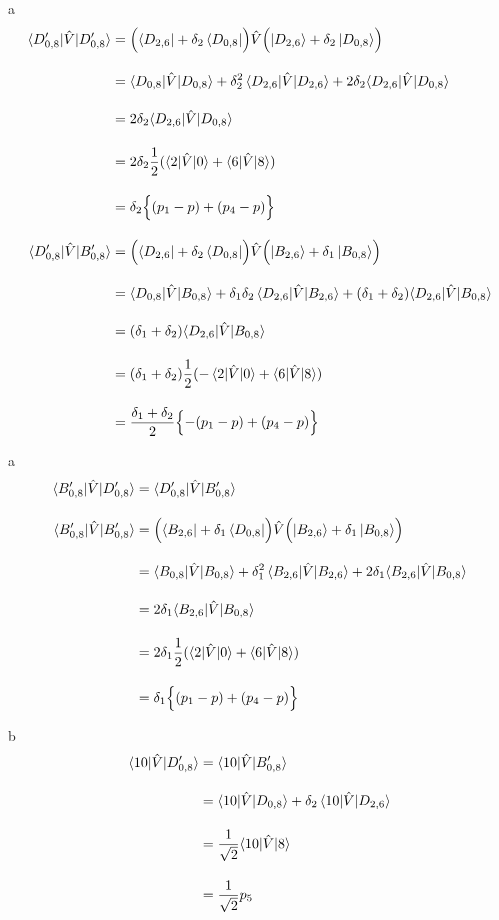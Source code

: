 a
\begin{align}
    \langle{D^\prime_{0,8}|\hat{V}|D^\prime_{0,8}}\rangle
    &=\Bigl(\bra{D_{2,6}} + \delta_2\bra{D_{0,8}}
    \Bigr)
    \hat{V}
    \Bigl(\ket{D_{2,6}} + \delta_2\ket{D_{0,8}}
    \Bigr)\nn[10pt]
    &=\langle{D_{0,8}|\hat{V}|D_{0,8}}\rangle
    +\delta_2^2\braket{D_{2,6}|\hat{V}|D_{2,6}} 
    +2\delta_2\langle{D_{2,6}|\hat{V}|D_{0,8}}\rangle\nn[10pt]
     &=2\delta_2\langle{D_{2,6}|\hat{V}|D_{0,8}}\rangle\nn[10pt]
    &=2\delta_2\frac{1}{2}(\braket{2|\hat{V}|0}+\braket{6|\hat{V}|8})
    \nn[10pt]
    &=\delta_2\Bigl\{
    (p_1-p) + (p_4-p)
    \Bigr\}\\[10pt]
   \langle{D^\prime_{0,8}|\hat{V}|B^\prime_{0,8}}\rangle
   &=\Bigl(\bra{D_{2,6}} + \delta_2\bra{D_{0,8}}
    \Bigr)
    \hat{V}
    \Bigl(\ket{B_{2,6}} + \delta_1\ket{B_{0,8}}
    \Bigr)\nn[10pt]
    &=\langle{D_{0,8}|\hat{V}|B_{0,8}}\rangle
    +\delta_1\delta_2\braket{D_{2,6}|\hat{V}|B_{2,6}} 
    +(\delta_1+\delta_2)\langle{D_{2,6}|\hat{V}|B_{0,8}}\rangle\nn[10pt]
     &=(\delta_1+\delta_2)\langle{D_{2,6}|\hat{V}|B_{0,8}}\rangle\nn[10pt]
    &=(\delta_1+\delta_2)\frac{1}{2}(-\braket{2|\hat{V}|0}+\braket{6|\hat{V}|8})
    \nn[10pt]
    &=\frac{\delta_1+\delta_2}{2}\Bigl\{
    -(p_1-p) + (p_4-p)
    \Bigr\}
\end{align}



a
\begin{align}
    \langle{B^\prime_{0,8}|\hat{V}|D^\prime_{0,8}}\rangle
    &=\langle{D^\prime_{0,8}|\hat{V}|B^\prime_{0,8}}\rangle\nn[10pt]
   \langle{B^\prime_{0,8}|\hat{V}|B^\prime_{0,8}}\rangle
   &=\Bigl(\bra{B_{2,6}} + \delta_1\bra{D_{0,8}}
    \Bigr)
    \hat{V}
    \Bigl(\ket{B_{2,6}} + \delta_1\ket{B_{0,8}}
    \Bigr)\nn[10pt]
    &=\langle{B_{0,8}|\hat{V}|B_{0,8}}\rangle
    +\delta_1^2\braket{B_{2,6}|\hat{V}|B_{2,6}} 
    +2\delta_1\langle{B_{2,6}|\hat{V}|B_{0,8}}\rangle\nn[10pt]
     &=2\delta_1\langle{B_{2,6}|\hat{V}|B_{0,8}}\rangle\nn[10pt]
    &=2\delta_1\frac{1}{2}(\braket{2|\hat{V}|0}+\braket{6|\hat{V}|8})
    \nn[10pt]
    &=\delta_1\Bigl\{
    (p_1-p) + (p_4-p)
    \Bigr\}
\end{align}




b
\begin{align}
    \langle{10|\hat{V}|D^\prime_{0,8}}\rangle
    &=\langle{10|\hat{V}|B^\prime_{0,8}}\rangle\nn[10pt]
   &=\langle{10|\hat{V}|D_{0,8}}\rangle
    +\delta_2\braket{10|\hat{V}|D_{2,6}}\nn[10pt]
     &=\frac{1}{\sqrt{2}}\langle{10|\hat{V}|8}\rangle\nn[10pt]
    &=\frac{1}{\sqrt{2}}p_5
\end{align}


